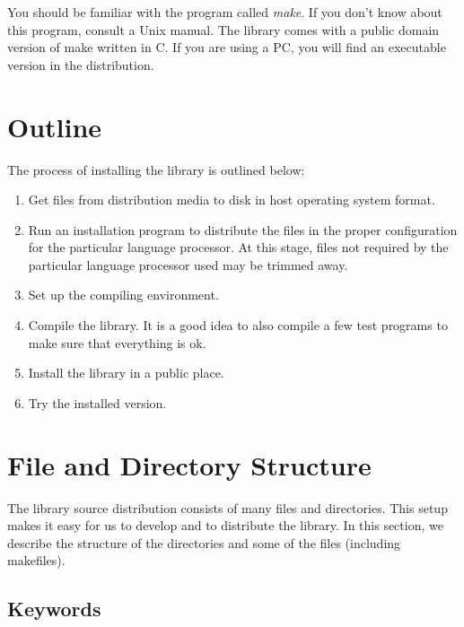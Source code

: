 You should be familiar with
the program called {\em make}.  If you don't know about this program,
consult a Unix manual.  The library comes with
a public domain version of make written in C.  If you are using
a PC, you will find an executable version in the distribution.

\section{Outline}
The process of installing the library is outlined below:

\begin{enumerate}
\item
    Get files from distribution media to disk in host operating system
    format.
\item
    Run an installation program to distribute the files in the proper
    configuration for the particular language processor.  At this stage,
    files not required by the particular language
    processor used may be trimmed away.
\item
    Set up the compiling environment.
\item
    Compile the library.  It is a good idea to also compile a few 
    test programs to make sure
    that everything is ok.
\item
    Install the library in a public place.
\item
    Try the installed version.
    
\end{enumerate}

\section{File and Directory Structure}
\label{FileStructure}

The library source distribution consists of many files and directories.
This setup makes it easy for us to develop and to distribute the library.
In this section, we describe the structure of the directories and some
of the files (including makefiles).

\subsection{Keywords}
\label{FileKeywords}

